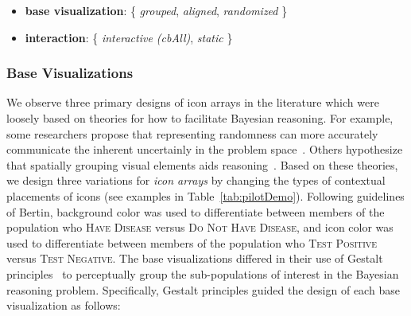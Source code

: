 \begin{itemize}
    \item \textbf{base visualization}: \{ \textit{grouped}, \textit{aligned}, \textit{randomized}  \}
    \item \textbf{interaction}: \{ \textit{interactive (cbAll)}, \textit{static} \}
\end{itemize}


\subsubsection{Base Visualizations}

We observe three primary designs of icon arrays in the literature which were loosely based on theories for how to facilitate Bayesian reasoning. For example, some researchers propose that representing randomness can more accurately communicate the inherent uncertainly in the problem space~\cite{han2011Representing}. Others hypothesize that spatially grouping visual elements aids reasoning~\cite{micallef2012Assessing}. Based on these theories, we design three variations for \textit{icon arrays} by changing the types of contextual placements of icons (see examples in Table~\ref{tab:pilotDemo}).  
Following guidelines of Bertin\cite{bertin}, background color was used to differentiate between members of the population who \textsc{Have Disease} versus \textsc{Do Not Have Disease}, and icon color was used to differentiate between members of the population who \textsc{Test Positive} versus \textsc{Test Negative}. The base visualizations differed in their use of Gestalt principles~\cite{gestalt} to perceptually group the sub-populations of interest in the Bayesian reasoning problem. Specifically, Gestalt principles guided the design of each base visualization as follows: 

